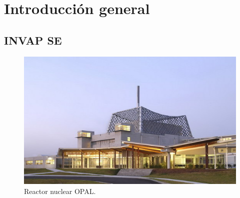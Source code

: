 
\chapter{Introducción general} %

\label{Chapter1} %
\label{IntroGeneral}


\newcommand{\keyword}[1]{\textbf{#1}}
\newcommand{\tabhead}[1]{\textbf{#1}}
\newcommand{\code}[1]{\texttt{#1}}
\newcommand{\file}[1]{\texttt{\bfseries#1}}
\newcommand{\option}[1]{\texttt{\itshape#1}}
\newcommand{\grados}{$^{\circ}$}



\section{INVAP SE}
\label{sec:invap}

\begin{figure}[htbp]
	\centering
	\includegraphics[width=.8\textwidth]{./Figures/invapopal.jpg}
	\caption{Reactor nuclear OPAL\citep{WEBSITE:invap}.}
	\label{fig:opal}
\end{figure}

